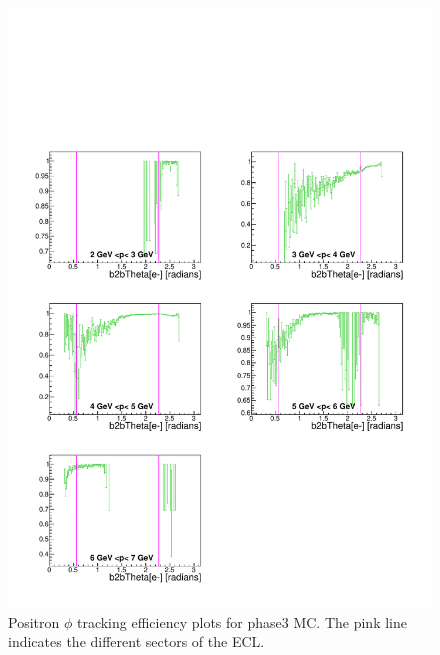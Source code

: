 \documentclass[a4paper,11pt,twosided,final,german,openbib,pdftex,listof=totoc,bibliography=totoc]{scrbook}
\begin{document}
\begin{appendix}
\begin{figure}[!htbp]
	\centering
	\includegraphics[width=\textwidth]{Plots/master3/xPMThetaep_MCP3}
	\caption[Momentum $\theta$ Positron Efficiency Phase3 MC]{Positron $\phi$ tracking efficiency plots for phase3 MC. The pink line indicates the different sectors of the ECL.}
	\label{plt:PMThetaep3_MC}
\end{figure}



\end{appendix}
\end{document}
